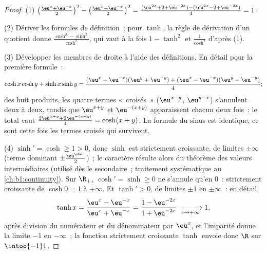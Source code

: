 \begin{proof}
(1) $\bigl(\frac{\eu^x + \eu^{-x}}{2}\bigr)^2 - \bigl(\frac{\eu^x -
\eu^{-x}}{2}\bigr)^2 = \frac{(\eu^{2x} + 2 + \eu^{-2x}) - (\eu^{2x} -
2 + \eu^{-2x})}{4} = 1$.

(2) Dériver les formules de définition~; pour $\tanh$, la règle de
dérivation d'un quotient donne $\frac{\cosh^2 - \sinh^2}{\cosh^2}$,
qui vaut à la fois $1 - \tanh^2$ et $\frac{1}{\cosh^2}$ d'après (1).

(3) Développer les membres de droite à l'aide des définitions. En
détail pour la première formule~:
\[
\cosh x\cosh y + \sinh x\sinh y
= \frac{(\eu^x + \eu^{-x})(\eu^y + \eu^{-y})
+ (\eu^x - \eu^{-x})(\eu^y - \eu^{-y})}{4} ;
\]
des huit produits, les quatre termes «~croisés~»
($\eu^{x-y}$, $\eu^{y-x}$) s'annulent deux à deux, tandis que
$\eu^{x+y}$ et $\eu^{-(x+y)}$ apparaissent chacun deux fois~:
le total vaut $\frac{2\eu^{x+y} + 2\eu^{-(x+y)}}{4} = \cosh(x+y)$.
La formule du sinus est identique, ce sont cette fois les termes
croisés qui survivent.

(4) $\sinh' = \cosh \geq 1 > 0$, donc $\sinh$ est strictement
croissante, de limites $\pm\infty$ (terme dominant $\pm\frac{\eu^{\abs
x}}{2}$)~; le caractère  résulte alors du théorème des valeurs
intermédiaires (utilisé dès le secondaire~; traitement systématique
au \cref{ch:b1:continuity}). Sur $\R_+$, $\cosh' = \sinh \geq 0$ ne
s'annule qu'en $0$~: strictement croissante de $\cosh 0 = 1$ à
$+\infty$. Et $\tanh' > 0$, de limites $\pm 1$ en $\pm\infty$~: en
détail,
\[
\tanh x = \frac{\eu^x - \eu^{-x}}{\eu^x + \eu^{-x}}
= \frac{1 - \eu^{-2x}}{1 + \eu^{-2x}}
\xrightarrow[x \to +\infty]{} 1 ,
\]
après division du numérateur et du dénominateur par $\eu^x$, et
l'imparité donne la limite $-1$ en $-\infty$~; la fonction
strictement croissante $\tanh$ envoie donc $\R$ sur $\intoo{-1}1$.
\end{proof}


